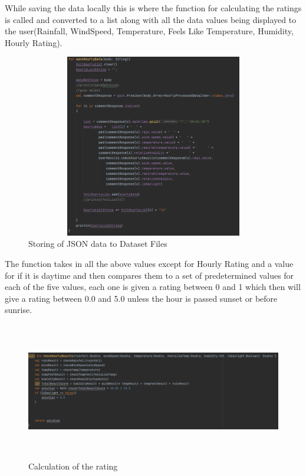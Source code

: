 While saving the data locally this is where the function for calculating the ratings is called and converted to a list along with all the data values being displayed to the user(Rainfall, WindSpeed, Temperature, Feels Like Temperature, Humidity, Hourly Rating).

\begin{figure}[H]
    \centering
    \includegraphics[width=12cm,height = 8cm]{img/DataStore.PNG}
    \caption{Storing of JSON data to Dataset Files}
    \label{fig:altas config}
\end{figure}

The function takes in all the above values except for Hourly Rating and a value for if it is daytime and then compares them to a set of predetermined values for each of the five values, each one is given a rating between 0 and 1 which then will give a rating between 0.0 and 5.0 unless the hour is passed sunset or before sunrise.

\begin{figure}[H]
    \centering
    \includegraphics[width=16cm,height = 6cm]{img/DataComparison.PNG}
    \caption{Calculation of the rating}
    \label{fig:altas config}
\end{figure}

